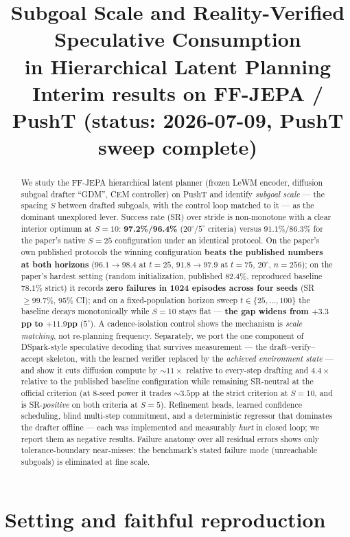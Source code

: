 \documentclass[11pt]{article}
\title{Subgoal Scale and Reality-Verified Speculative Consumption\\
in Hierarchical Latent Planning\\
\large Interim results on FF-JEPA / PushT (status: 2026-07-09, PushT sweep complete)}
\author{}
\date{}
\newcommand{\ours}[1]{\textbf{#1}}
\newcommand{\degc}[1]{$#1^\circ$}
\begin{document}
\maketitle

\begin{abstract}
We study the FF-JEPA hierarchical latent planner (frozen LeWM encoder, diffusion
subgoal drafter ``GDM'', CEM controller) on PushT and identify \emph{subgoal scale}
--- the spacing $S$ between drafted subgoals, with the control loop matched to it ---
as the dominant unexplored lever. Success rate (SR) over stride is non-monotone with a
clear interior optimum at $S{=}10$: \ours{97.2\%/96.4\%} (\degc{20}/\degc{5} criteria)
versus $91.1\%/86.3\%$ for the paper's native $S{=}25$ configuration under an
identical protocol. On the paper's own published protocols the winning configuration
\ours{beats the published numbers at both horizons} ($96.1 \to 98.4$ at $t{=}25$,
$91.8 \to 97.9$ at $t{=}75$, \degc{20}, $n{=}256$); on the paper's hardest setting
(random initialization, published $82.4\%$, reproduced baseline $78.1\%$ strict) it
records \ours{zero failures in 1024 episodes across four seeds} (SR $\ge 99.7\%$,
95\% CI); and on a fixed-population horizon sweep $t \in \{25,\dots,100\}$ the
baseline decays monotonically while $S{=}10$ stays flat --- \ours{the gap widens
from $+3.3$pp to $+11.9$pp} (\degc{5}). A cadence-isolation control shows the
mechanism is \emph{scale matching}, not re-planning frequency. Separately, we port
the one component of DSpark-style speculative decoding that survives measurement ---
the draft--verify--accept skeleton, with the learned verifier replaced by the
\emph{achieved environment state} --- and show it cuts diffusion compute by
${\sim}11\times$ relative to every-step drafting and $4.4\times$ relative to the
published baseline configuration while remaining SR-neutral at the official
criterion (at 8-seed power it trades ${\sim}3.5$pp at the strict criterion at
$S{=}10$, and is SR-\emph{positive} on both criteria at $S{=}5$). Refinement heads,
learned confidence scheduling, blind multi-step commitment, and a deterministic
regressor that dominates the drafter offline --- each was implemented and measurably
\emph{hurt} in closed loop; we report them as negative results. Failure anatomy over
all residual errors shows only tolerance-boundary near-misses: the benchmark's
stated failure mode (unreachable subgoals) is eliminated at fine scale.
\end{abstract}

\section{Setting and faithful reproduction}
\end{document}
